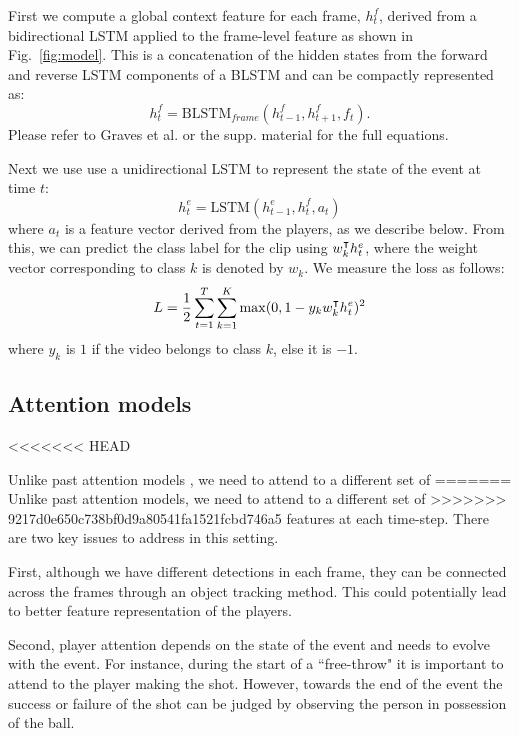 {First we compute a global context feature for each frame, $h_t^f$, derived from
a bidirectional LSTM applied to the frame-level feature as shown in Fig.~\ref{fig:model}.
This is a concatenation of the hidden states from the forward and reverse LSTM
components of a BLSTM and can be compactly represented as:
\[
  h_t^f = \mbox{BLSTM}_{frame}(h_{t-1}^f, h_{t+1}^f, f_t).
\]Please refer to Graves et al. \cite{Graves_2013} or the supp. material
for the full equations.

Next we use use a unidirectional LSTM to represent the state of the
event at time $t$:
\[
h_t^e = \mbox{LSTM}(h_{t-1}^e, h_t^f, a_t)
\]
where $a_t$ is a feature vector derived from the players, as we
describe below.
From this, we can predict the class label for the clip using
$w_k^{\intercal} h_t^e$,
where the weight vector corresponding to
class $k$ is denoted by $w_k$.
 We measure the loss as follows:
\begin{equation}
  L =   \frac{1}{2} \sum_{t=1}^T \sum_{k = 1}^K \max (0, 1 - y_k w_k^{\intercal} h^e_t)^2
\end{equation} 
where $y_k$ is $1$ if the video belongs to class $k$,
else it is $-1$.

\subsection{Attention models}
<<<<<<< HEAD

Unlike past attention models \cite{}, we need to attend to a different set of
=======
Unlike past attention models, we need to attend to a different set of
>>>>>>> 9217d0e650c738bf0d9a80541fa1521fcbd746a5
features at each time-step. There are two key issues to address in this
setting.

First, although we have different detections in each frame, they
can be connected across the frames through an object tracking
method. This could potentially lead to better feature representation of the
players.

Second, player attention depends on the state of the event and needs to evolve
with the event.  For instance, during the start of a ``free-throw" it is
important to attend to the player making the shot. However, towards the end of
the event the success or failure of the shot can be judged by observing the
person in possession of the ball.

}
